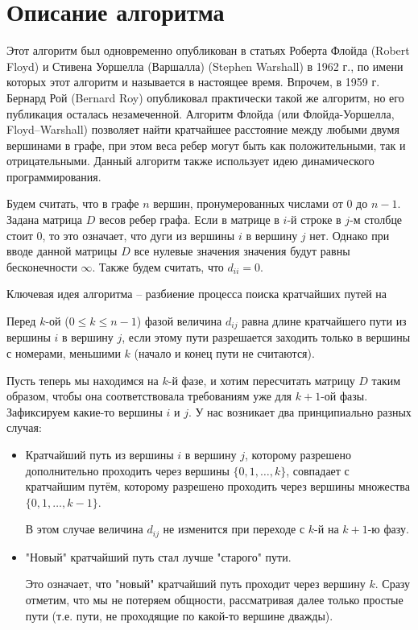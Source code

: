 \documentclass[bachelor, och, labwork]{shiza}
\begin{document}

\tableofcontents


\section{Описание алгоритма}

  Этот алгоритм был одновременно опубликован в статьях Роберта Флойда (Robert Floyd) и Стивена Уоршелла (Варшалла) (Stephen Warshall) в 1962 г., по имени которых этот алгоритм
  и называется в настоящее время. Впрочем, в 1959 г. Бернард Рой (Bernard Roy) опубликовал практически такой же алгоритм, но его публикация осталась незамеченной.
  Алгоритм Флойда (или Флойда-Уоршелла, Floyd–Warshall) позволяет найти кратчайшее расстояние между любыми двумя вершинами в графе, при этом веса ребер 
  могут быть как положительными, так и отрицательными. Данный алгоритм также использует идею динамического программирования.
  
  Будем считать, что в графе $n$ вершин, пронумерованных числами от $0$ до $n-1$. Задана матрица $D$
  весов ребер графа. Если в матрице в $i$-й строке в $j$-м столбце стоит 0, то это означает, что
  дуги из вершины $i$ в вершину $j$ нет. Однако при вводе данной матрицы $D$ все нулевые значения
  значения будут равны бесконечности $\infty$. Также будем считать, что $d_{ii} = 0$.

  Ключевая идея алгоритма -- разбиение процесса поиска кратчайших путей на 
 
  Перед $k$-ой ($0 \leq k \leq n-1$) фазой величина $d_{ij}$ равна длине кратчайшего пути из вершины $i$ в вершину $j$, если этому пути разрешается заходить только в вершины с номерами, меньшими $k$ (начало и конец пути не считаются).
  
  Пусть теперь мы находимся на $k$-й фазе, и хотим пересчитать матрицу $D$ таким образом, чтобы она соответствовала требованиям уже для $k+1$-ой фазы. Зафиксируем какие-то вершины $i$ и $j$. У нас возникает два принципиально разных случая:
  
  \begin{itemize}
    \item Кратчайший путь из вершины $i$ в вершину $j$, которому разрешено дополнительно проходить через вершины $\{ 0, 1, \ldots, k \}$, совпадает с кратчайшим путём, которому разрешено проходить через вершины множества $\{ 0, 1, \ldots, k-1 \}$.
    
    В этом случае величина $d_{ij}$ не изменится при переходе с $k$-й на $k+1$-ю фазу.
    \item "Новый" кратчайший путь стал лучше "старого" пути.
    
    Это означает, что "новый" кратчайший путь проходит через вершину $k$. Сразу отметим, что мы не потеряем общности, рассматривая далее только простые пути (т.е. пути, не проходящие по какой-то вершине дважды).
  \end{itemize}
 
\end{document}
